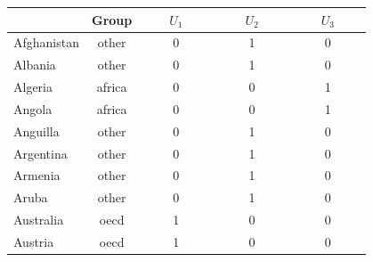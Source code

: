 \documentclass[14pt]{extarticle}
\begin{document}
\noindent
\begin{tabular}{lcccc}
\toprule
\textbf{\quad \quad \quad \quad \quad} & \textbf{\quad \quad Group \quad \quad} & $\quad \quad U_1 \quad \quad$ & $\quad \quad U_2 \quad \quad$ & $\quad \quad U_3 \quad \quad$ \\
\midrule
Afghanistan & other & 0 & 1 & 0 \\
Albania     & other & 0 & 1 & 0 \\
Algeria     & africa & 0 & 0 & 1 \\
Angola      & africa & 0 & 0 & 1 \\
Anguilla    & other & 0 & 1 & 0 \\
Argentina   & other & 0 & 1 & 0 \\
Armenia     & other & 0 & 1 & 0 \\
Aruba       & other & 0 & 1 & 0 \\
Australia   & oecd & 1 & 0 & 0 \\
Austria     & oecd & 1 & 0 & 0 \\
\bottomrule
\end{tabular}\vspace{0.2cm}
\end{document}
